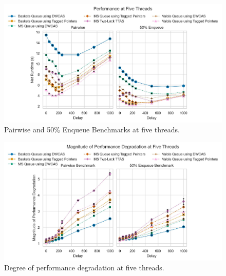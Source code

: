 \begin{figure}[!ht]
    \centering
    \includegraphics[width=1\textwidth]{images/plots/delay_thread_5.jpg}
    \caption{Pairwise and 50\% Enqueue Benchmarks at five threads.}
    \label{fig:perf_5_thread}
\end{figure}

\begin{figure}[!ht]
    \centering
    \includegraphics[width=1\textwidth]{images/plots/speedup_4.jpg}
    \caption{Degree of performance degradation at five threads.}
    \label{fig:perf_deg_5_thread}
\end{figure}

